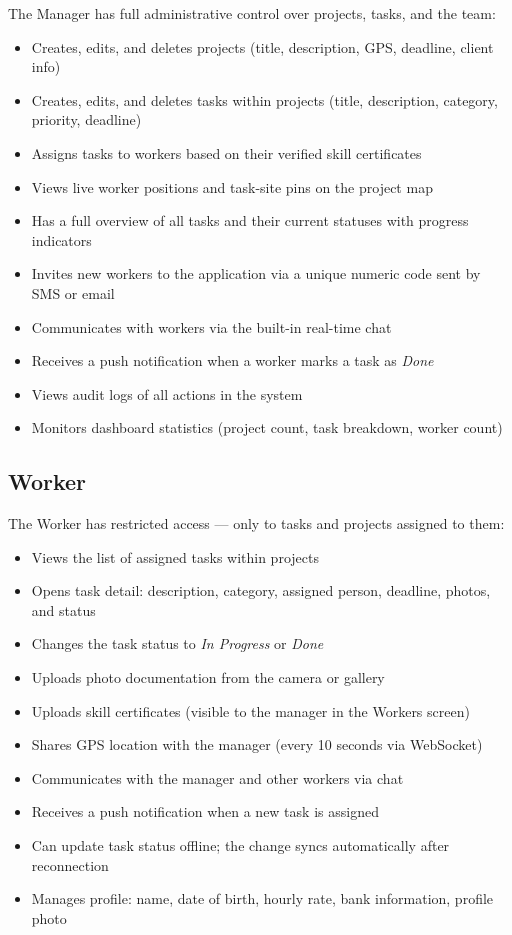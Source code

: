 \documentclass[12pt,a4paper]{article}
\begin{document}
The Manager has full administrative control over projects, tasks, and the team:

\begin{itemize}[noitemsep]
    \item Creates, edits, and deletes projects (title, description, GPS, deadline, client info)
    \item Creates, edits, and deletes tasks within projects (title, description, category, priority, deadline)
    \item Assigns tasks to workers based on their verified skill certificates
    \item Views live worker positions and task-site pins on the project map
    \item Has a full overview of all tasks and their current statuses with progress indicators
    \item Invites new workers to the application via a unique numeric code sent by SMS or email
    \item Communicates with workers via the built-in real-time chat
    \item Receives a push notification when a worker marks a task as \textit{Done}
    \item Views audit logs of all actions in the system
    \item Monitors dashboard statistics (project count, task breakdown, worker count)
\end{itemize}

\subsection{Worker}

The Worker has restricted access --- only to tasks and projects assigned to them:

\begin{itemize}[noitemsep]
    \item Views the list of assigned tasks within projects
    \item Opens task detail: description, category, assigned person, deadline, photos, and status
    \item Changes the task status to \textit{In Progress} or \textit{Done}
    \item Uploads photo documentation from the camera or gallery
    \item Uploads skill certificates (visible to the manager in the Workers screen)
    \item Shares GPS location with the manager (every 10 seconds via WebSocket)
    \item Communicates with the manager and other workers via chat
    \item Receives a push notification when a new task is assigned
    \item Can update task status offline; the change syncs automatically after reconnection
    \item Manages profile: name, date of birth, hourly rate, bank information, profile photo
\end{itemize}
\end{document}
